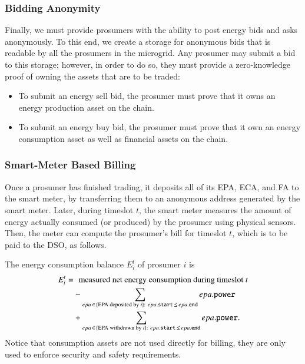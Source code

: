 \subsubsection{Bidding Anonymity}
Finally, we must provide prosumers with the ability to post energy bids and asks anonymously.
To this end, we create a storage for anonymous bids that is readable by all the prosumers in the microgrid.
Any prosumer may submit a bid to this storage; however, in order to do so, they must provide a zero-knowledge proof of owning the assets that are to be traded:
\begin{itemize}
\item To submit an energy sell bid, the prosumer must prove that it owns an energy production asset on the chain.
\item To submit an energy buy bid, the prosumer must prove that it own an energy consumption asset as well as financial assets on the chain.
\end{itemize}

\subsubsection{Smart-Meter Based Billing}
Once a prosumer has finished trading, it deposits all of its EPA, ECA, and FA to the smart meter, by transferring them to an anonymous address generated by the smart meter.
Later, during timeslot $t$, the smart meter measures the amount of energy actually consumed (or produced) by the prosumer using physical sensors.
Then, the meter can compute the prosumer's bill for timeslot $t$, which is to be paid to the DSO, as follows.

The energy consumption balance $E_i^t$ of prosumer $i$ is
\begin{align*}
E_i^t = & \hphantom{+} \text{measured net energy consumption during timeslot } t \\ %
 & - \sum_{epa \,\in\, \{\text{EPA deposited by } i\}: ~ epa.\field{start} \,\leq\, epa.\field{end}} epa.\field{power} \\
 & + \sum_{epa \,\in\, \{\text{EPA withdrawn by } i\}: ~ epa.\field{start} \,\leq\, epa.\field{end}} epa.\field{power} .
\end{align*}
Notice that consumption assets are not used directly for billing, they are only used to enforce security and safety requirements.

